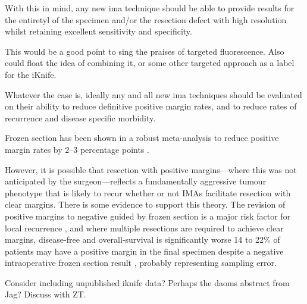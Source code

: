 With this in mind, any new \gls{ima} technique should be able to provide results for the entiretyl of the specimen and/or the resection defect with high resolution whilst retaining excellent sensitivity and specificity.

This would be a good point to sing the praises of targeted fluorescence.
Also could float the idea of combining it, or some other targeted approach as a label for the iKnife.


Whatever the case is, ideally any and all new \gls{ima} techniques should be evaluated on their ability to reduce definitive positive margin rates, and to reduce rates of recurrence and disease specific morbidity.

Frozen section has been shown in a robust meta-analysis to reduce positive margin rates by 2--3 percentage points \cite{gorpheSystematicReviewMetaanalysis2019}.

However, it is possible that resection with positive margins---where this was not anticipated by the surgeon---reflects a fundamentally aggressive tumour phenotype that is likely to recur whether or not IMAs facilitate resection with clear margins.
There is some evidence to support this theory.
The revision of positive margins to negative guided by frozen section is a major risk factor for local recurrence \cite{ettlt.PositiveFrozenSection2016}, and where multiple resections are required to achieve clear margins, disease-free and overall-survival is significantly worse \cite{mooreTransoralRoboticSurgery2018}
14 to 22\% of patients may have a positive margin in the final specimen despite a negative intraoperative frozen section result \cite{ordAccuracyFrozenSections1997, due.RefiningUtilityRole2016}, probably representing sampling error.

Consider including unpublished iknife data? Perhaps the daoms abstract from Jag? Discuss with ZT.

